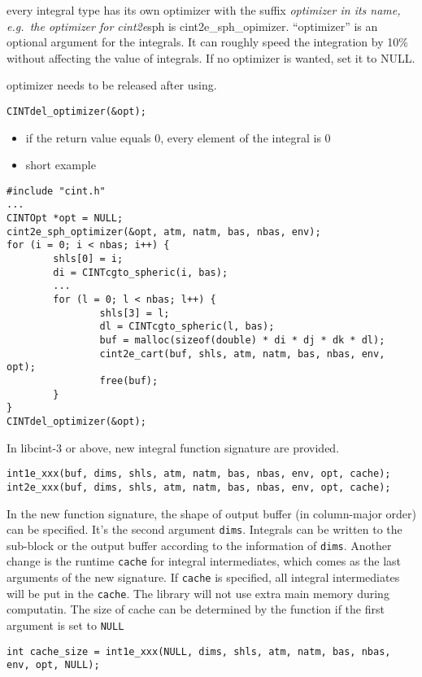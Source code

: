 \documentclass[]{article}
\begin{document}
every integral type has its own optimizer with the suffix
\emph{optimizer in its name, e.g.~the optimizer for cint2e}sph is
cint2e\_sph\_opimizer. ``optimizer'' is an optional argument for the
integrals. It can roughly speed the integration by 10\% without
affecting the value of integrals. If no optimizer is wanted, set it to
NULL.

optimizer needs to be released after using.

\begin{verbatim}
CINTdel_optimizer(&opt);
\end{verbatim}

\begin{itemize}
\item
  if the return value equals 0, every element of the integral is 0
\item
  short example
\end{itemize}

\begin{verbatim}
#include "cint.h"
...
CINTOpt *opt = NULL;
cint2e_sph_optimizer(&opt, atm, natm, bas, nbas, env);
for (i = 0; i < nbas; i++) {
        shls[0] = i;
        di = CINTcgto_spheric(i, bas);
        ...
        for (l = 0; l < nbas; l++) {
                shls[3] = l;
                dl = CINTcgto_spheric(l, bas);
                buf = malloc(sizeof(double) * di * dj * dk * dl);
                cint2e_cart(buf, shls, atm, natm, bas, nbas, env, opt);
                free(buf);
        }
}
CINTdel_optimizer(&opt);
\end{verbatim}

In libcint-3 or above, new integral function signature are provided.
\begin{verbatim}
int1e_xxx(buf, dims, shls, atm, natm, bas, nbas, env, opt, cache);
int2e_xxx(buf, dims, shls, atm, natm, bas, nbas, env, opt, cache);
\end{verbatim}
In the new
function signature, the shape of output buffer (in column-major order) can be
specified. It's the second argument \verb$dims$. Integrals can be written
to the sub-block or the output buffer according to the information of
\verb$dims$. Another change is the runtime \verb$cache$ for integral
intermediates, which comes as the last arguments of the new signature. If
\verb$cache$ is specified, all integral intermediates will be put in the
\verb$cache$. The library will not use extra main memory during computatin. The
size of cache can be determined by the function if the first argument is set to
\verb$NULL$
\begin{verbatim}
int cache_size = int1e_xxx(NULL, dims, shls, atm, natm, bas, nbas, env, opt, NULL);
\end{verbatim}
\end{document}
